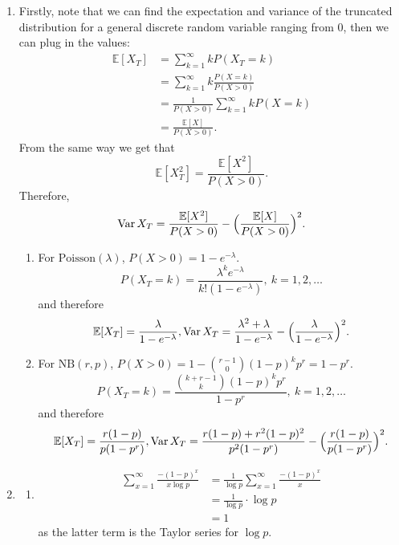\documentclass{article}
\DeclareMathOperator{\var}{Var}
\begin{document}
\begin{enumerate}
    \item Firstly, note that we can find the expectation and variance of the truncated distribution for a 
    general discrete random variable ranging from 0, then we can plug in the values:
    \begin{align*}
        \mathbb{E}[X_{T}]
        &= \sum_{k = 1}^{\infty} kP(X_{T} = k) \\
        &= \sum_{k = 1}^{\infty} k\frac{P(X = k)}{P(X > 0)} \\
        &= \frac{1}{P(X > 0)} \sum_{k = 1}^{\infty} kP(X = k) \\
        &= \frac{\mathbb{E}[X]}{P(X > 0)}.
    \end{align*}
    From the same way we get that 
    \[ \mathbb{E}[X_{T}^2] = \frac{\mathbb{E}[X^2]}{P(X > 0)}. \]
    Therefore, 
    \[ \var{X_{T}} = \frac{\mathbb{E}[X^2]}{P(X > 0)} - \Bigl( \frac{\mathbb{E}[X]}{P(X > 0)} \Bigr)^2. \]

    \begin{enumerate}
        \item For $\text{Poisson}(\lambda)$, $P(X > 0) = 1 - e^{-\lambda}$.
        \[ P(X_{T} = k) = \frac{\lambda^{k} e^{-\lambda}}{k!(1 - e^{-\lambda})}, \ k = 1, 2, \dots \]
        and therefore 
        \[ \mathbb{E}[X_{T}] = \frac{\lambda}{1 - e^{-\lambda}}, 
        \var{X_{T}} = \frac{\lambda^2 + \lambda}{1 - e^{-\lambda}} 
        - \Bigl( \frac{\lambda}{1 - e^{-\lambda}}\Bigr)^2. \]

        \item For $\text{NB}(r, p)$, $P(X > 0) = 1 - \binom{r - 1}{0} (1 - p)^{k}p^{r} = 1 - p^{r}$.
        \[ P(X_{T} = k) = \frac{\binom{k + r - 1}{k}(1 - p)^{k} p^{r}}{1 - p^{r}}, \ k = 1, 2, \dots \]
        and therefore 
        \[ \mathbb{E}[X_{T}] = \frac{r(1 - p)}{p(1 - p^{r})}, 
        \var{X_{T}} = \frac{r(1 - p) + r^{2}(1 - p)^{2}}{p^{2}(1 - p^{r})} 
        - \Bigl( \frac{r(1 - p)}{p(1 - p^{r})} \Bigr)^{2}. \]
    \end{enumerate}

    \item \begin{enumerate}
        \item \begin{align*}
            \sum_{x = 1}^{\infty} \frac{-(1 - p)^{x}}{x\log{p}} 
            &= \frac{1}{\log{p}} \sum_{x = 1}^{\infty} \frac{-(1 - p)^{x}}{x} \\
            &= \frac{1}{\log{p}} \cdot \log{p} \\
            &= 1
        \end{align*}
        as the latter term is the Taylor series for $\log{p}$.


\end{enumerate}
\end{enumerate}
\end{document}
